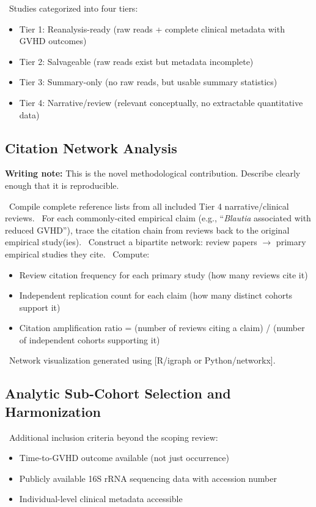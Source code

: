 \documentclass[11pt,a4paper]{article}
\newcommand{\todoitem}[1]{\textcolor{blue!70!black}{\textbullet~#1}}
\newcommand{\writingnote}[1]{\par\noindent\colorbox{yellow!30}{\parbox{\dimexpr\linewidth-2\fboxsep}{%
  \small\textbf{Writing note:} #1}}\par\medskip}
\begin{document}
\todoitem{Studies categorized into four tiers:}
\begin{itemize}[nosep]
    \item Tier 1: Reanalysis-ready (raw reads + complete clinical metadata with GVHD outcomes)
    \item Tier 2: Salvageable (raw reads exist but metadata incomplete)
    \item Tier 3: Summary-only (no raw reads, but usable summary statistics)
    \item Tier 4: Narrative/review (relevant conceptually, no extractable quantitative data)
\end{itemize}

\subsection{Citation Network Analysis}
\label{sec:citation_network}

\writingnote{This is the novel methodological contribution. Describe clearly enough that it is reproducible.}

\todoitem{Compile complete reference lists from all included Tier 4 narrative/clinical reviews.}
\todoitem{For each commonly-cited empirical claim (e.g., ``\textit{Blautia} associated with reduced GVHD''), trace the citation chain from reviews back to the original empirical study(ies).}
\todoitem{Construct a bipartite network: review papers $\to$ primary empirical studies they cite.}
\todoitem{Compute:}
\begin{itemize}[nosep]
    \item Review citation frequency for each primary study (how many reviews cite it)
    \item Independent replication count for each claim (how many distinct cohorts support it)
    \item Citation amplification ratio = (number of reviews citing a claim) / (number of independent cohorts supporting it)
\end{itemize}
\todoitem{Network visualization generated using [R/igraph or Python/networkx].}

\subsection{Analytic Sub-Cohort Selection and Harmonization}
\label{sec:subcohort_methods}
\todoitem{Additional inclusion criteria beyond the scoping review:}
\begin{itemize}[nosep]
    \item Time-to-GVHD outcome available (not just occurrence)
    \item Publicly available 16S rRNA sequencing data with accession number
    \item Individual-level clinical metadata accessible
\end{itemize}
\end{document}
